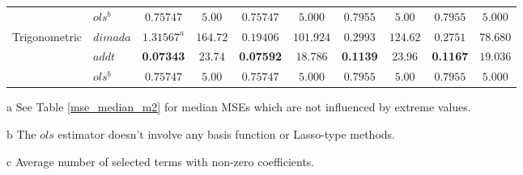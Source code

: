 \documentclass[12pt, a4paper]{article}
\theoremstyle{MAstyle} \newtheorem{assumption}{Assumption}[section]
\theoremstyle{MAstyle} \newtheorem{definition}{Definition}[section]
\theoremstyle{MAstyle} \newtheorem{theorem}{Theorem}[section]
\theoremstyle{MAstyle} \newtheorem{corollary}{Corollary}[section]
\begin{document}
\begin{table}[!htbp]
{\begin{threeparttable}
\begin{tabular}{llcccccccc}
                        & $ols^b$ & $0.75747$ & $5.00$ & $0.75747$ & $5.000$ & $0.7955$ & $5.00$ & $0.7955$ & $5.000$ \\
                        Trigonometric & $dimada$ & $1.31567^a$ & $164.72$ & $0.19406$ & $101.924$ & $0.2993$ & $124.62$ & $0.2751$ & $78.680$ \\
                        & $addt$ & \textbf{0.07343} & $23.74$ & \textbf{0.07592} & $18.786$ & \textbf{0.1139} & $23.96$ & \textbf{0.1167} & $19.036$ \\
                        & $ols^b$ & $0.75747$ & $5.00$ & $0.75747$ & $5.000$ & $0.7955$ & $5.00$ & $0.7955$ & $5.000$ \\
                        \hline 
                        \hline
                    \end{tabular}
                    \begin{tablenotes}
                        \footnotesize   %
                        \item[a] See Table \ref{mse_median_m2} for median MSEs which are not influenced by extreme values.
                        \item [b] The $ols$ estimator doesn't involve any basis function or Lasso-type methods.
                        \item [c] Average number of selected terms with non-zero coefficients.
                    \end{tablenotes}
                    \end{threeparttable}
                    }
                \end{table} 
\end{document}
